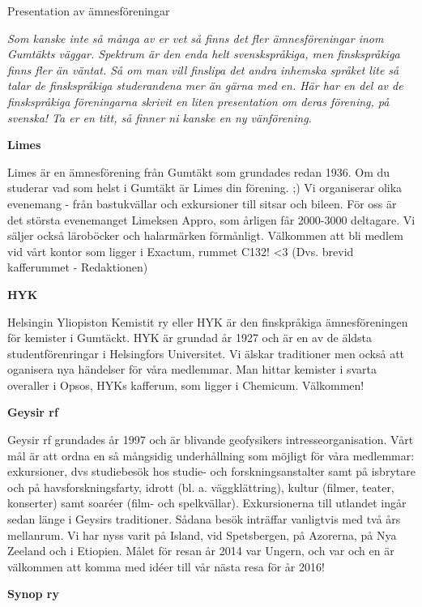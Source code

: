 \documentclass{spektraklet}
\begin{document}
\newpage

\begin{artikel}{Presentation av ämnesföreningar}{}

\textit{Som kanske inte så många av er vet så finns det fler ämnesföreningar inom Gumtäkts
väggar. Spektrum är den enda helt svenskspråkiga, men finskspråkiga finns fler än väntat. Så
om man vill finslipa det andra inhemska språket lite så talar de finskspråkiga studerandena
mer än gärna med en. Här har en del av de finskspråkiga föreningarna skrivit en liten
presentation om deras förening, på svenska! Ta er en titt, så finner ni kanske en ny
vänförening.}

\textbf{Limes}

Limes är en ämnesförening från Gumtäkt som grundades redan 1936.
Om du studerar vad som helst i Gumtäkt är Limes din förening. ;)
Vi organiserar olika evenemang - från bastukvällar och exkursioner till sitsar och bileen.
För oss är det största evenemanget Limeksen Appro, som årligen får 2000-3000 deltagare.
Vi säljer också läroböcker och halarmärken förmånligt.
Välkommen att bli medlem vid vårt kontor som ligger i Exactum, rummet C132! <3
(Dvs. brevid kafferummet - Redaktionen)

\textbf{HYK}

Helsingin Yliopiston Kemistit ry eller HYK är den finskpråkiga ämnesföreningen för kemister i Gumtäckt.
HYK är grundad år 1927 och är en av de äldsta studentförenringar i Helsingfors
Universitet.
Vi älskar traditioner men också att oganisera nya händelser för våra medlemmar.
Man hittar kemister i svarta overaller i Opsos, HYKs kafferum, som ligger i Chemicum.
Välkommen!

\textbf{Geysir rf}

Geysir rf grundades år 1997 och är blivande geofysikers intresseorganisation. Vårt mål är att ordna en så mångsidig underhållning som möjligt för våra medlemmar: exkursioner,
dvs studiebesök hos studie- och forskningsanstalter samt på isbrytare och på havsforskningsfarty, idrott (bl. a. väggklättring), kultur (filmer, teater, konserter) samt soaréer (film- och spelkvällar). Exkursionerna till utlandet ingår sedan länge i Geysirs traditioner. Sådana besök inträffar vanligtvis med två års mellanrum. Vi har nyss varit på Island, vid Spetsbergen, på Azorerna, på Nya Zeeland och i Etiopien. Målet för resan år 2014 var Ungern, och var och en är välkommen att komma med idéer till vår nästa resa för år 2016!

\textbf{Synop ry}


\end{artikel}
\end{document}
